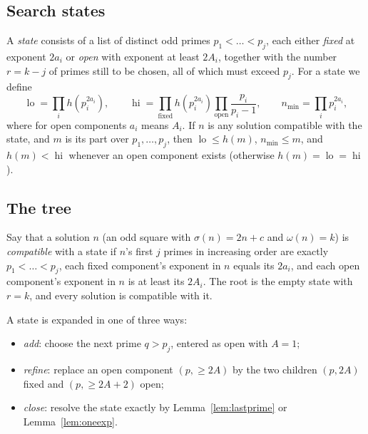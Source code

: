 \documentclass[11pt]{amsart}
\theoremstyle{remark}
\DeclareMathOperator{\lo}{lo}
\DeclareMathOperator{\hi}{hi}
\begin{document}
\subsection{Search states}
A \emph{state} consists of a list of distinct odd primes $p_1 < \dots < p_j$,
each either \emph{fixed} at exponent $2a_i$ or \emph{open} with exponent at
least $2A_i$, together with the number $r = k - j$ of primes still to be chosen,
all of which must exceed $p_j$. For a state we define
\[
  \lo = \prod_{i} h(p_i^{2a_i}), \qquad
  \hi = \prod_{\text{fixed}} h(p_i^{2a_i}) \prod_{\text{open}} \frac{p_i}{p_i - 1},
  \qquad n_{\min} = \prod_i p_i^{2a_i},
\]
where for open components $a_i$ means $A_i$. If $n$ is any solution compatible
with the state, and $m$ is its part over $p_1, \dots, p_j$, then
$\lo \le h(m)$, $n_{\min} \le m$, and $h(m) < \hi$ whenever an open component
exists (otherwise $h(m) = \lo = \hi$).

\subsection{The tree}
Say that a solution $n$ (an odd square with $\sigma(n) = 2n+c$ and
$\omega(n) = k$) is \emph{compatible} with a state if $n$'s first $j$ primes in
increasing order are exactly $p_1 < \dots < p_j$, each fixed component's
exponent in $n$ equals its $2a_i$, and each open component's exponent in $n$ is
at least its $2A_i$. The root is the empty state with $r = k$, and every
solution is compatible with it.

A state is expanded in one of three ways:
\begin{itemize}
\item \emph{add}: choose the next prime $q > p_j$, entered as open with $A = 1$;
\item \emph{refine}: replace an open component $(p, \ge 2A)$ by the two
  children $(p, 2A)$ fixed and $(p, \ge 2A + 2)$ open;
\item \emph{close}: resolve the state exactly by
  Lemma~\ref{lem:lastprime} or Lemma~\ref{lem:oneexp}.
\end{itemize}
\end{document}
